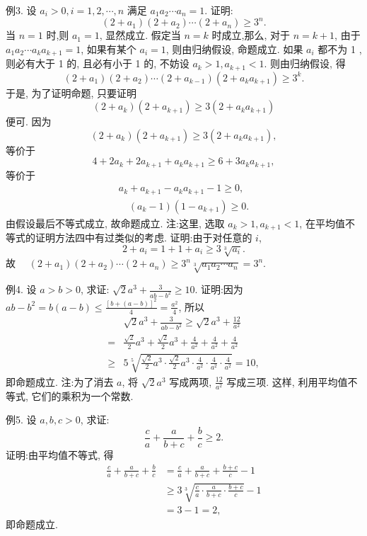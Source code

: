 例3. 设 $a_i>0, i=1,2, \cdots, n$ 满足 $a_1 a_2 \cdots a_n=1$. 证明:
$$
\left(2+a_1\right)\left(2+a_2\right) \cdots\left(2+a_n\right) \geqslant 3^n .
$$
当 $n=1$ 时,则 $a_1=1$, 显然成立.
假定当 $n=k$ 时成立,那么, 对于 $n= k+1$, 由于 $a_1 a_2 \cdots a_k a_{k+1}=1$, 如果有某个 $a_i=1$, 则由归纳假设, 命题成立.
如果 $a_i$ 都不为 1 , 则必有大于 1 的, 且必有小于 1 的, 不妨设 $a_k>1, a_{k+1}<1$. 则由归纳假设, 得
$$
\left(2+a_1\right)\left(2+a_2\right) \cdots\left(2+a_{k-1}\right)\left(2+a_k a_{k+1}\right) \geqslant 3^k .
$$
于是, 为了证明命题, 只要证明
$$
\left(2+a_k\right)\left(2+a_{k+1}\right) \geqslant 3\left(2+a_k a_{k+1}\right)
$$
便可.
因为
$$
\left(2+a_k\right)\left(2+a_{k+1}\right) \geqslant 3\left(2+a_k a_{k+1}\right),
$$
等价于
$$
4+2 a_k+2 a_{k+1}+a_k a_{k+1} \geqslant 6+3 a_k a_{k+1},
$$
等价于
$$
\begin{gathered}
a_k+a_{k+1}-a_k a_{k+1}-1 \geqslant 0, \\
\quad\left(a_k-1\right)\left(1-a_{k+1}\right) \geqslant 0 .
\end{gathered}
$$
由假设最后不等式成立, 故命题成立.
注:这里, 选取 $a_k>1, a_{k+1}<1$, 在平均值不等式的证明方法四中有过类似的考虑.
证明:由于对任意的 $i$,
$$
2+a_i=1+1+a_i \geqslant 3 \sqrt[3]{a_i} .
$$
故 $\quad\left(2+a_1\right)\left(2+a_2\right) \cdots\left(2+a_n\right) \geqslant 3^n \sqrt[3]{a_1 a_2 \cdots a_n}=3^n$.



例4. 设 $a>b>0$, 求证: $\sqrt{2} a^3+\frac{3}{a b-b^2} \geqslant 10$.
证明:因为 $a b-b^2=b(a-b) \leqslant \frac{[b+(a-b)]^2}{4}=\frac{a^2}{4}$, 所以
$$
\begin{aligned}
& \sqrt{2} a^3+\frac{3}{a b-b^2} \geqslant \sqrt{2} a^3+\frac{12}{a^2} \\
= & \frac{\sqrt{2}}{2} a^3+\frac{\sqrt{2}}{2} a^3+\frac{4}{a^2}+\frac{4}{a^2}+\frac{4}{a^2} \\
\geqslant & 5 \sqrt[5]{\frac{\sqrt{2}}{2} a^3 \cdot \frac{\sqrt{2}}{2} a^3 \cdot \frac{4}{a^2} \cdot \frac{4}{a^2} \cdot \frac{4}{a^2}}=10,
\end{aligned}
$$
即命题成立.
注:为了消去 $a$, 将 $\sqrt{2} a^3$ 写成两项, $\frac{12}{a^2}$ 写成三项.
这样, 利用平均值不等式, 它们的乘积为一个常数.



例5. 设 $a, b, c>0$, 求证:
$$
\frac{c}{a}+\frac{a}{b+c}+\frac{b}{c} \geqslant 2 .
$$
证明:由平均值不等式, 得
$$
\begin{aligned}
\frac{c}{a}+\frac{a}{b+c}+\frac{b}{c} & =\frac{c}{a}+\frac{a}{b+c}+\frac{b+c}{c}-1 \\
& \geqslant 3 \sqrt[3]{\frac{c}{a} \cdot \frac{a}{b+c} \cdot \frac{b+c}{c}}-1 \\
& =3-1=2,
\end{aligned}
$$
即命题成立.



